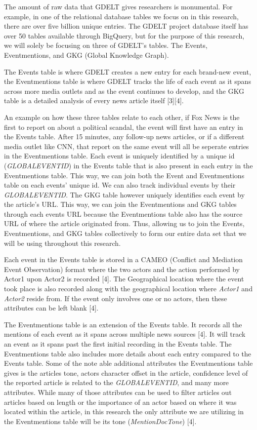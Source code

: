 \documentclass[12pt]{article}
\begin{document}
The amount of raw data that GDELT gives researchers is monumental. For example, in one of the relational database tables we focus on in this research, there are over five billion unique entries. The GDELT project database itself has over 50 tables available through BigQuery, but for the purpose of this research, we will solely be focusing on three of GDELT's tables. The Events, Eventmentions, and GKG (Global Knowledge Graph). 

The Events table is where GDELT creates a new entry for each brand-new event, the Eventmentions table is where GDELT tracks the life of each event as it spans across more media outlets and as the event continues to develop, and the GKG table is a detailed analysis of every news article itself [3][4].

An example on how these three tables relate to each other, if Fox News is the first to report on about a political scandal, the event will first have an entry in the Events table. After 15 minutes, any follow-up news articles, or if a different media outlet like CNN, that report on the same event will all be seperate entries in the Eventmentions table. Each event is uniquely identified by a unique id (\textit{GLOBALEVENTID}) in the Events table that is also present in each entry in the Eventmentions table. This way, we can join both the Event and Eventmentions table on each events’ unique id. We can also track individual events by their \textit{GLOBALEVENTID}. The GKG table however uniquely identifies each event by the article’s URL. This way, we can join the Eventmentions and GKG tables through each events URL because the Eventmentions table also has the source URL of where the article originated from. Thus, allowing us to join the Events, Eventmentions, and GKG tables collectively to form our entire data set that we will be using throughout this research.

Each event in the Events table is stored in a CAMEO (Conflict and Mediation Event Observation) format where the two actors and the action performed by Actor1 upon Actor2 is recorded [4]. The Geographical location where the event took place is also recorded along with the geographical location where \textit{Actor1} and \textit{Actor2} reside from. If the event only involves one or no actors, then these attributes can be left blank [4].

The Eventmentions table is an extension of the Events table. It records all the mentions of each event as it spans across multiple news sources [4]. It will track an event as it spans past the first initial recording in the Events table. The Eventmentions table also includes more details about each entry compared to the Events table. Some of the note able additional attributes the Eventmentions table gives is the articles tone, actors character offset in the article, confidence level of the reported article is related to the \textit{GLOBALEVENTID}, and many more attributes. While many of those attributes can be used to filter articles out articles based on length or the importance of an actor based on where it was located within the article, in this research the only attribute we are utilizing in the Eventmentions table will be its tone (\textit{MentionDocTone}) [4]. 
\end{document}
